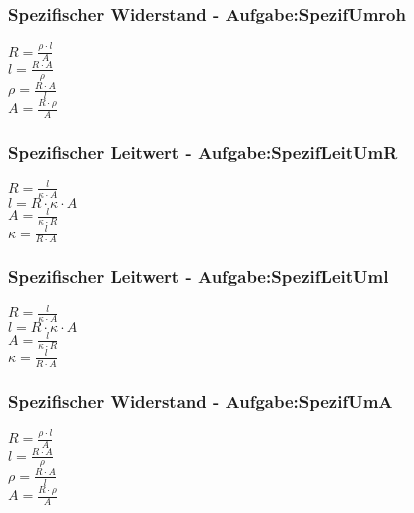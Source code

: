 \subsubsection{Spezifischer Widerstand - Aufgabe:SpezifUmroh} 
\begin{minipage}{0.45\textwidth} 
$ R = \frac{\rho \cdot l}{ A} $\\ 
$ l = \frac{R\cdot A}{ \rho } $\\ 
$ \rho  = \frac{R\cdot A}{ l} $\\ 
$ A = \frac{R\cdot \rho }{ A} $\\ 
\end{minipage} 
\begin{minipage}{0.45\textwidth} 
 
\end{minipage} 
\subsubsection{Spezifischer Leitwert - Aufgabe:SpezifLeitUmR} 
\begin{minipage}{0.45\textwidth} 
$ R = \frac{ l}{\kappa \cdot A} $\\ 
$ l = R\cdot \kappa \cdot A $\\ 
$ A = \frac{l}{\kappa \cdot R} $\\ 
$ \kappa  = \frac{ l}{R\cdot A} $\\ 
\end{minipage} 
\begin{minipage}{0.45\textwidth} 
 
\end{minipage} 
\subsubsection{Spezifischer Leitwert - Aufgabe:SpezifLeitUml} 
\begin{minipage}{0.45\textwidth} 
$ R = \frac{ l}{\kappa \cdot A} $\\ 
$ l = R\cdot \kappa \cdot A $\\ 
$ A = \frac{l}{\kappa \cdot R} $\\ 
$ \kappa  = \frac{ l}{R\cdot A} $\\ 
\end{minipage} 
\begin{minipage}{0.45\textwidth} 
 
\end{minipage} 
\subsubsection{Spezifischer Widerstand - Aufgabe:SpezifUmA} 
\begin{minipage}{0.45\textwidth} 
$ R = \frac{\rho \cdot l}{ A} $\\ 
$ l = \frac{R\cdot A}{ \rho } $\\ 
$ \rho  = \frac{R\cdot A}{ l} $\\ 
$ A = \frac{R\cdot \rho }{ A} $\\ 
\end{minipage} 
\begin{minipage}{0.45\textwidth} 
 
\end{minipage} 
